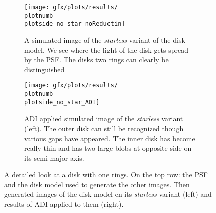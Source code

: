 \begin{figure}[h!]
{\begin{minipage}[t]{1.2\textwidth}
      \begin{subfigure}[t]{0.6\textwidth}
        \centering
        \texttt{[image: gfx/plots/results/\\plotnumb\_\\plotside\_no\_star\_noReductin]}
        \caption{A simulated image of the \textit{starless} variant of the disk model. We see where the light of the disk gets spread by the PSF. The disks two rings can clearly be distinguished}
      \end{subfigure}%
      \begin{subfigure}[t]{0.6\textwidth}
        \centering
        \texttt{[image: gfx/plots/results/\\plotnumb\_\\plotside\_no\_star\_ADI]}
        \caption{\ac{ADI} applied simulated image of the \textit{starless} variant (left). The outer disk can still be recognized though various gaps have appeared. The inner disk has become really thin and has two large blobs at opposite side on its semi major axis.}
      \end{subfigure}
  \end{minipage}
  }%

  \caption{A detailed look at a disk with one rings. On the top row: the \ac{PSF} and the disk model used to generate the other images. Then generated images of the disk model en its \textit{starless} variant (left) and results of \ac{ADI} applied to them (right).}
  \label{fig:disk4_0}
\end{figure}

